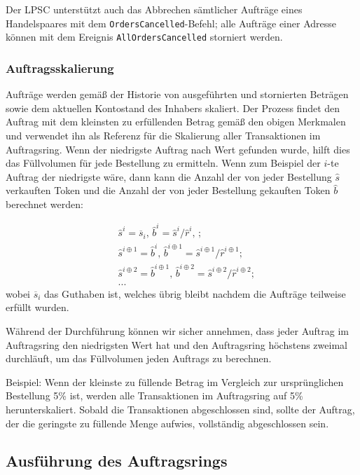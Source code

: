 \documentclass[UTF8,nofonts]{article}
\begin{document}
\begin{multicols}{2}
Der LPSC unterstützt auch das Abbrechen sämtlicher Aufträge eines Handelspaares mit dem \verb|OrdersCancelled|-Befehl; alle Aufträge einer Adresse können mit dem Ereignis \verb|AllOrdersCancelled| storniert werden.

\subsubsection{Auftragsskalierung\label{sec:order_scaling}}
Aufträge werden gemäß der Historie von ausgeführten und stornierten Beträgen sowie dem aktuellen Kontostand des Inhabers skaliert. Der Prozess findet den Auftrag mit dem kleinsten zu erfüllenden Betrag gemäß den obigen Merkmalen und verwendet ihn als Referenz für die Skalierung aller Transaktionen im Auftragsring.
Wenn der niedrigste Auftrag nach Wert gefunden wurde, hilft dies das Füllvolumen für jede Bestellung zu ermitteln. Wenn zum Beispiel der $i$-te Auftrag der niedrigste wäre,  dann kann die Anzahl der von jeder Bestellung $\hat{s}$ verkauften Token und die Anzahl der von jeder Bestellung gekauften Token $\hat{b}$ berechnet werden:

\[
\begin{split}
&\hat{s}^{i}=\overline{s}_i\text{, } \hat{b}^{i}=\hat{s}^{i}/ \hat{r}^i\text{, }\text{;}\\
&\hat{s}^{i\oplus 1}=\hat{b}^i\text{, } \hat{b}^{i\oplus 1}=\hat{s}^{i\oplus 1}/ \hat{r}^{i\oplus 1}\text{;}\\
&\hat{s}^{i\oplus 2}=\hat{b}^{i\oplus 1}\text{, } \hat{b}^{i\oplus 2}=\hat{s}^{i\oplus 2}/ \hat{r}^{i\oplus 2}\text{;}\\
& ...
\end{split}
\]
wobei $\overline{s}_i$ das Guthaben ist, welches übrig bleibt nachdem die Aufträge teilweise erfüllt wurden.

Während der Durchführung können wir sicher annehmen, dass jeder Auftrag im Auftragsring den niedrigsten Wert hat und den Auftragsring höchstens zweimal durchläuft, um das Füllvolumen jeden Auftrags zu berechnen.

Beispiel: Wenn der kleinste zu füllende Betrag im Vergleich zur ursprünglichen Bestellung 5\% ist, werden alle Transaktionen im Auftragsring auf 5\% herunterskaliert. Sobald die Transaktionen abgeschlossen sind, sollte der Auftrag, der die geringste zu füllende Menge aufwies, vollständig abgeschlossen sein.

\subsection{Ausführung des Auftragsrings\label{sec:settlement}}


\end{multicols}
\end{document}
